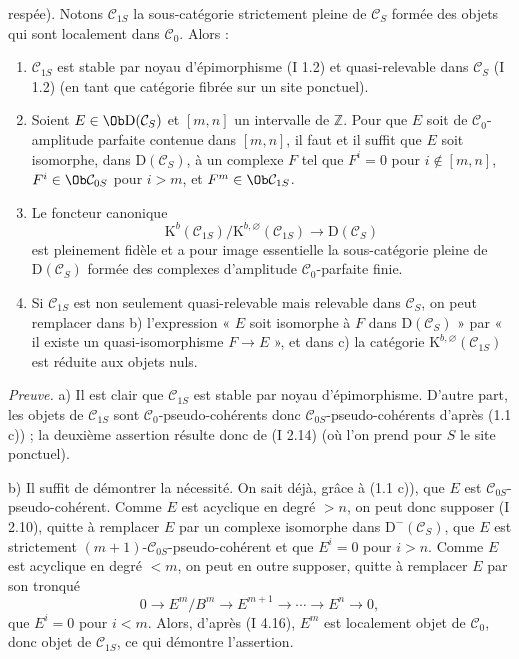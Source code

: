 respée). Notons $\mathcal C_{1S}$ la sous-catégorie strictement pleine de $\mathcal C_S$ formée des objets qui sont localement dans $\mathcal C_0$. Alors :
\begin{enumerate}[label=\alph*)]
\item $\mathcal C_{1S}$ est stable par noyau d'épimorphisme (I 1.2) et quasi-relevable dans $\mathcal C_S$ (I 1.2) (en tant que catégorie fibrée sur un site ponctuel).
\item Soient $E\in\Ob\mathrm D(\mathcal C_S)$ et $[m,n]$ un intervalle de $\mathbb Z$. Pour que $E$ soit de $\mathcal C_0$-amplitude parfaite contenue dans $[m,n]$, il faut et il suffit que $E$ soit isomorphe, dans $\mathrm D(\mathcal C_S)$, à un complexe $F$ tel que $F^i=0$ pour $i\notin[m,n]$, $F^i\in\Ob\mathcal C_{0S}$ pour $i>m$, et $F^m\in\Ob\mathcal C_{1S}$.
\item Le foncteur canonique
\[
\mathrm K^b(\mathcal C_{1S})/\mathrm K^{b,\varnothing}(\mathcal C_{1S})
\longrightarrow \mathrm D(\mathcal C_S)
\]
est pleinement fidèle et a pour image essentielle la sous-catégorie pleine de $\mathrm D(\mathcal C_S)$ formée des complexes d'amplitude $\mathcal C_0$-parfaite finie.
\item Si $\mathcal C_{1S}$ est non seulement quasi-relevable mais relevable dans $\mathcal C_S$, on peut remplacer dans b) l'expression « $E$ soit isomorphe à $F$ dans $\mathrm D(\mathcal C_S)$ » par « il existe un quasi-isomorphisme $F\to E$ », et dans c) la catégorie $\mathrm K^{b,\varnothing}(\mathcal C_{1S})$ est réduite aux objets nuls.
\end{enumerate}

\emph{Preuve.} a) Il est clair que $\mathcal C_{1S}$ est stable par noyau d'épimorphisme. D'autre part, les objets de $\mathcal C_{1S}$ sont $\mathcal C_0$-pseudo-cohérents donc $\mathcal C_{0S}$-pseudo-cohérents d'après (1.1 c)) ; la deuxième assertion résulte donc de (I 2.14) (où l'on prend pour $S$ le site ponctuel).

b) Il suffit de démontrer la nécessité. On sait déjà, grâce à (1.1 c)), que $E$ est $\mathcal C_{0S}$-pseudo-cohérent. Comme $E$ est acyclique en degré $>n$, on peut donc supposer (I 2.10), quitte à remplacer $E$ par un complexe isomorphe dans $\mathrm D^{-}(\mathcal C_S)$, que $E$ est strictement $(m+1)$-$\mathcal C_{0S}$-pseudo-cohérent et que $E^i=0$ pour $i>n$. Comme $E$ est acyclique en degré $<m$, on peut en outre supposer, quitte à remplacer $E$ par son tronqué
\[
0\longrightarrow E^m/B^m\longrightarrow E^{m+1}\longrightarrow\cdots\longrightarrow E^n\longrightarrow0,
\]
que $E^i=0$ pour $i<m$. Alors, d'après (I 4.16), $E^m$ est localement objet de $\mathcal C_0$, donc objet de $\mathcal C_{1S}$, ce qui démontre l'assertion.

